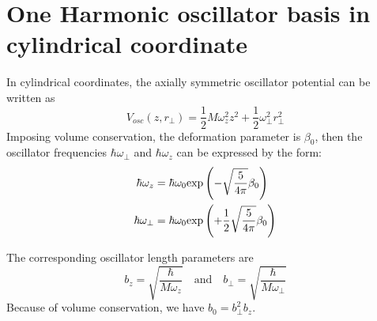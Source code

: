 \section{One Harmonic oscillator basis in cylindrical coordinate}
In cylindrical coordinates, the axially symmetric oscillator potential can be written as
\begin{equation}
    V_{osc}(z, r_{\perp}) = \frac{1}{2} M \omega_z^2 z^2 + \frac{1}{2} \omega_{\perp}^2 r_{\perp}^2  \label{oc_potential}
\end{equation}
Imposing volume conservation, the deformation parameter is $\beta_0$, then the oscillator frequencies $\hbar \omega_{\perp}$ and $\hbar \omega_{z}$ can be expressed by the form:
\begin{equation}
\begin{aligned}
    \hbar \omega_{z} &= \hbar \omega_0 {\rm exp}\left( -\sqrt{\frac{5}{4\pi}} \beta_0 \right) \\
    \hbar \omega_{\perp} &= \hbar \omega_0 {\rm exp}\left( + \frac{1}{2} \sqrt{\frac{5}{4\pi}} \beta_0\right)    \label{oc_}
\end{aligned}
\end{equation}

The corresponding oscillator length parameters are 
\begin{equation}
    b_z = \sqrt{ \frac{\hbar}{M \omega_z} }  \quad \text{and}  \quad  b_{\perp} = \sqrt{ \frac{\hbar}{M \omega_{\perp} } }
\end{equation}
Because of volume conservation, we have $b_0 = b_{\perp}^2 b_{z}$.

